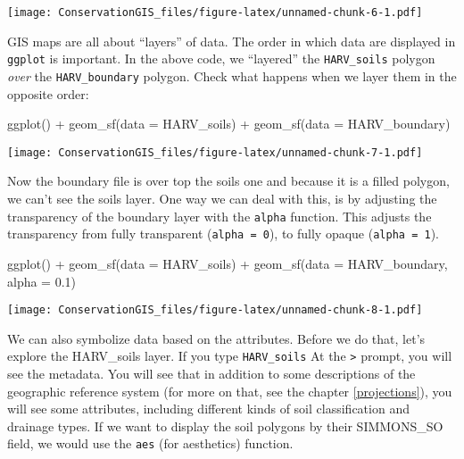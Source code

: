 \documentclass[
]{book}
\newenvironment{Shaded}{\begin{snugshade}}{\end{snugshade}}
\newcommand{\AttributeTok}[1]{\textcolor[rgb]{0.77,0.63,0.00}{#1}}
\newcommand{\FloatTok}[1]{\textcolor[rgb]{0.00,0.00,0.81}{#1}}
\newcommand{\FunctionTok}[1]{\textcolor[rgb]{0.00,0.00,0.00}{#1}}
\newcommand{\NormalTok}[1]{#1}
\newcommand{\SpecialCharTok}[1]{\textcolor[rgb]{0.00,0.00,0.00}{#1}}
\begin{document}
\texttt{[image: ConservationGIS\_files/figure-latex/unnamed-chunk-6-1.pdf]}

GIS maps are all about ``layers'' of data. The order in which data are displayed in \texttt{ggplot} is important. In the above code, we ``layered'' the \texttt{HARV\_soils} polygon \emph{over} the \texttt{HARV\_boundary} polygon. Check what happens when we layer them in the opposite order:

\begin{Shaded}
\begin{Highlighting}[]
\FunctionTok{ggplot}\NormalTok{() }\SpecialCharTok{+}
  \FunctionTok{geom\_sf}\NormalTok{(}\AttributeTok{data =}\NormalTok{ HARV\_soils) }\SpecialCharTok{+} 
  \FunctionTok{geom\_sf}\NormalTok{(}\AttributeTok{data =}\NormalTok{ HARV\_boundary)}
\end{Highlighting}
\end{Shaded}

\texttt{[image: ConservationGIS\_files/figure-latex/unnamed-chunk-7-1.pdf]}

Now the boundary file is over top the soils one and because it is a filled polygon, we can't see the soils layer. One way we can deal with this, is by adjusting the transparency of the boundary layer with the \texttt{alpha} function. This adjusts the transparency from fully transparent (\texttt{alpha\ =\ 0}), to fully opaque (\texttt{alpha\ =\ 1}).

\begin{Shaded}
\begin{Highlighting}[]
\FunctionTok{ggplot}\NormalTok{() }\SpecialCharTok{+}
  \FunctionTok{geom\_sf}\NormalTok{(}\AttributeTok{data =}\NormalTok{ HARV\_soils) }\SpecialCharTok{+} 
  \FunctionTok{geom\_sf}\NormalTok{(}\AttributeTok{data =}\NormalTok{ HARV\_boundary, }\AttributeTok{alpha =} \FloatTok{0.1}\NormalTok{)}
\end{Highlighting}
\end{Shaded}

\texttt{[image: ConservationGIS\_files/figure-latex/unnamed-chunk-8-1.pdf]}

We can also symbolize data based on the attributes. Before we do that, let's explore the HARV\_soils layer. If you type \texttt{HARV\_soils} At the \texttt{\textgreater{}} prompt, you will see the metadata. You will see that in addition to some descriptions of the geographic reference system (for more on that, see the chapter \ref{projections}), you will see some attributes, including different kinds of soil classification and drainage types. If we want to display the soil polygons by their SIMMONS\_SO field, we would use the \texttt{aes} (for aesthetics) function.
\end{document}
